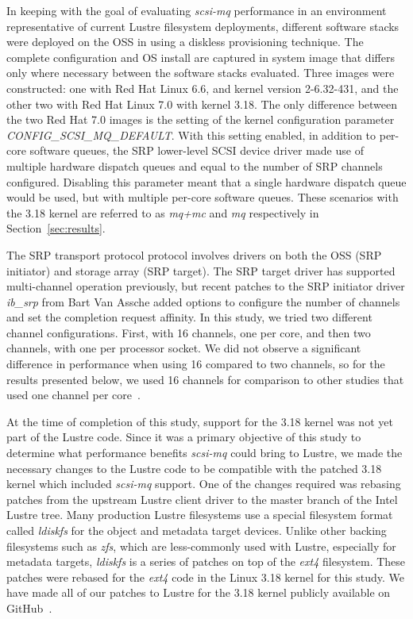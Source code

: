 \documentclass[conference]{IEEEtran}
\begin{document}
In keeping with the goal of evaluating \emph{scsi-mq} performance in an
environment representative of current Lustre
filesystem deployments, different software stacks were deployed on the OSS
in using a diskless provisioning technique. The complete configuration 
and OS install are captured in system image that differs only where necessary between 
the software stacks evaluated. Three images were constructed: one with Red Hat
Linux 6.6, and kernel version 2-6.32-431, and the other two with Red Hat Linux
7.0 with kernel 3.18. The only difference between the two Red Hat 7.0 images
is the setting of the kernel configuration parameter
\emph{CONFIG\_SCSI\_MQ\_DEFAULT}. With this setting enabled, in addition to per-core software
queues, the SRP lower-level SCSI device driver made use of multiple hardware dispatch queues and
equal to the number of SRP channels configured. Disabling this parameter meant that a single hardware
dispatch queue would be used, but with multiple per-core software queues. These scenarios
with the 3.18 kernel are referred to as \emph{mq+mc} and \emph{mq} respectively in Section~\ref{sec:results}.

The SRP transport protocol protocol involves drivers on both the OSS (SRP initiator) and
storage array (SRP target).  The SRP target driver has supported multi-channel operation previously,
but recent patches to the SRP initiator driver \emph{ib\_srp} from Bart Van
Assche added options to configure the number of channels and set the
completion request affinity. In this study, we tried two different channel configurations. First, with 16 channels, one per core,
and then two channels, with one per processor socket. We did not observe a significant
difference in performance when using 16 compared to two channels, so for the results
presented below, we used 16 channels for comparison to other studies that used one channel
per core~\cite{www:scsimq:v2}.


At the time of completion of this study, support for the 3.18 kernel was not yet
part of the Lustre code. Since it was a primary objective of this study to determine
what performance benefits \emph{scsi-mq} could bring to Lustre, we
made the necessary changes to the Lustre code to be compatible with the
patched 3.18 kernel which included \emph{scsi-mq} support. One of the changes
required was rebasing patches from the upstream Lustre client driver to the master
branch of the Intel Lustre tree. Many production Lustre filesystems use a special filesystem
format called \emph{ldiskfs} for the object and metadata target devices. Unlike
other backing filesystems such as \emph{zfs}, which are less-commonly used with Lustre,
especially for metadata targets, \emph{ldiskfs} is a series of patches on
top of the \emph{ext4} filesystem. These patches were rebased for the \emph{ext4}
code in the Linux 3.18 kernel for this study. We have made all of our patches to
Lustre for the 3.18 kernel publicly available on GitHub~\cite{www:github:lustre318}.
\end{document}
